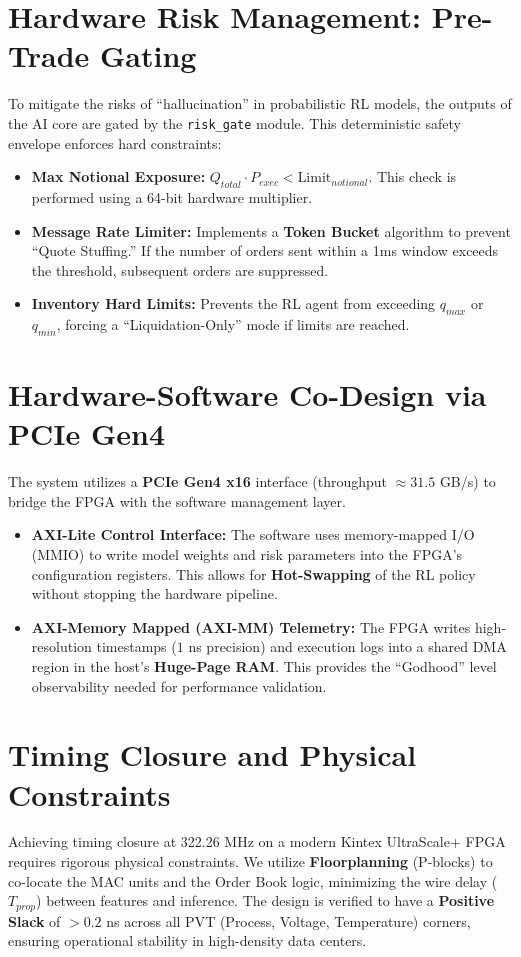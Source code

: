 \section{Hardware Risk Management: Pre-Trade Gating}
To mitigate the risks of ``hallucination'' in probabilistic RL models, the outputs of the AI core are gated by the \texttt{risk\_gate} module. This deterministic safety envelope enforces hard constraints:
\begin{itemize}
    \item \textbf{Max Notional Exposure:} $Q_{total} \cdot P_{exec} < \text{Limit}_{notional}$. This check is performed using a 64-bit hardware multiplier.
    \item \textbf{Message Rate Limiter:} Implements a \textbf{Token Bucket} algorithm to prevent ``Quote Stuffing.'' If the number of orders sent within a 1ms window exceeds the threshold, subsequent orders are suppressed.
    \item \textbf{Inventory Hard Limits:} Prevents the RL agent from exceeding $q_{max}$ or $q_{min}$, forcing a ``Liquidation-Only'' mode if limits are reached.
\end{itemize}

\section{Hardware-Software Co-Design via PCIe Gen4}
The system utilizes a \textbf{PCIe Gen4 x16} interface (throughput $\approx 31.5$ GB/s) to bridge the FPGA with the software management layer.
\begin{itemize}
    \item \textbf{AXI-Lite Control Interface:} The software uses memory-mapped I/O (MMIO) to write model weights and risk parameters into the FPGA's configuration registers. This allows for \textbf{Hot-Swapping} of the RL policy without stopping the hardware pipeline.
    \item \textbf{AXI-Memory Mapped (AXI-MM) Telemetry:} The FPGA writes high-resolution timestamps ($1$ ns precision) and execution logs into a shared DMA region in the host's \textbf{Huge-Page RAM}. This provides the ``Godhood'' level observability needed for performance validation.
\end{itemize}

\section{Timing Closure and Physical Constraints}
Achieving timing closure at 322.26 MHz on a modern Kintex UltraScale+ FPGA requires rigorous physical constraints. We utilize \textbf{Floorplanning} (P-blocks) to co-locate the MAC units and the Order Book logic, minimizing the wire delay ($T_{prop}$) between features and inference. The design is verified to have a \textbf{Positive Slack} of $> 0.2$ ns across all PVT (Process, Voltage, Temperature) corners, ensuring operational stability in high-density data centers.


